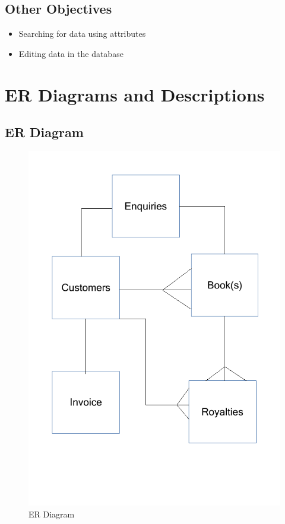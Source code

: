 \subsection{Other Objectives}

\begin{itemize}
    \item Searching for data using attributes
    \item Editing data in the database
\end{itemize}

\section{ER Diagrams and Descriptions}

\subsection{ER Diagram}

\begin{figure}[H]
    \caption{ER Diagram} \label{ER_Diagram.pdf}
    \includegraphics[width=\textwidth]{./Analysis/ER_Diagram.pdf}
\end{figure}

